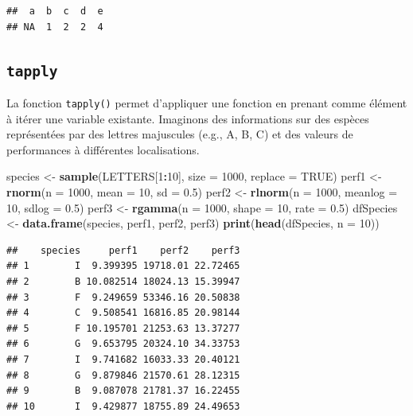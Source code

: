 \documentclass[
]{book}
\newenvironment{Shaded}{\begin{snugshade}}{\end{snugshade}}
\newcommand{\DataTypeTok}[1]{\textcolor[rgb]{0.13,0.29,0.53}{#1}}
\newcommand{\DecValTok}[1]{\textcolor[rgb]{0.00,0.00,0.81}{#1}}
\newcommand{\FloatTok}[1]{\textcolor[rgb]{0.00,0.00,0.81}{#1}}
\newcommand{\KeywordTok}[1]{\textcolor[rgb]{0.13,0.29,0.53}{\textbf{#1}}}
\newcommand{\NormalTok}[1]{#1}
\newcommand{\OperatorTok}[1]{\textcolor[rgb]{0.81,0.36,0.00}{\textbf{#1}}}
\newcommand{\OtherTok}[1]{\textcolor[rgb]{0.56,0.35,0.01}{#1}}
\newcommand{\StringTok}[1]{\textcolor[rgb]{0.31,0.60,0.02}{#1}}
\begin{document}
\begin{verbatim}
##  a  b  c  d  e 
## NA  1  2  2  4
\end{verbatim}

\hypertarget{l17tapply}{%
\subsection{\texorpdfstring{\texttt{tapply}}{tapply}}\label{l17tapply}}

La fonction \texttt{tapply()} permet d'appliquer une fonction en prenant comme élément à itérer une variable existante. Imaginons des informations sur des espèces représentées par des lettres majuscules (e.g., A, B, C) et des valeurs de performances à différentes localisations.

\begin{Shaded}
\begin{Highlighting}[]
\NormalTok{species <-}\StringTok{ }\KeywordTok{sample}\NormalTok{(LETTERS[}\DecValTok{1}\OperatorTok{:}\DecValTok{10}\NormalTok{], }\DataTypeTok{size =} \DecValTok{1000}\NormalTok{, }\DataTypeTok{replace =} \OtherTok{TRUE}\NormalTok{)}
\NormalTok{perf1 <-}\StringTok{ }\KeywordTok{rnorm}\NormalTok{(}\DataTypeTok{n =} \DecValTok{1000}\NormalTok{, }\DataTypeTok{mean =} \DecValTok{10}\NormalTok{, }\DataTypeTok{sd =} \FloatTok{0.5}\NormalTok{)}
\NormalTok{perf2 <-}\StringTok{ }\KeywordTok{rlnorm}\NormalTok{(}\DataTypeTok{n =} \DecValTok{1000}\NormalTok{, }\DataTypeTok{meanlog =} \DecValTok{10}\NormalTok{, }\DataTypeTok{sdlog =} \FloatTok{0.5}\NormalTok{)}
\NormalTok{perf3 <-}\StringTok{ }\KeywordTok{rgamma}\NormalTok{(}\DataTypeTok{n =} \DecValTok{1000}\NormalTok{, }\DataTypeTok{shape =} \DecValTok{10}\NormalTok{, }\DataTypeTok{rate =} \FloatTok{0.5}\NormalTok{)}
\NormalTok{dfSpecies <-}\StringTok{ }\KeywordTok{data.frame}\NormalTok{(species, perf1, perf2, perf3)}
\KeywordTok{print}\NormalTok{(}\KeywordTok{head}\NormalTok{(dfSpecies, }\DataTypeTok{n =} \DecValTok{10}\NormalTok{))}
\end{Highlighting}
\end{Shaded}

\begin{verbatim}
##    species     perf1    perf2    perf3
## 1        I  9.399395 19718.01 22.72465
## 2        B 10.082514 18024.13 15.39947
## 3        F  9.249659 53346.16 20.50838
## 4        C  9.508541 16816.85 20.98144
## 5        F 10.195701 21253.63 13.37277
## 6        G  9.653795 20324.10 34.33753
## 7        I  9.741682 16033.33 20.40121
## 8        G  9.879846 21570.61 28.12315
## 9        B  9.087078 21781.37 16.22455
## 10       I  9.429877 18755.89 24.49653
\end{verbatim}
\end{document}
